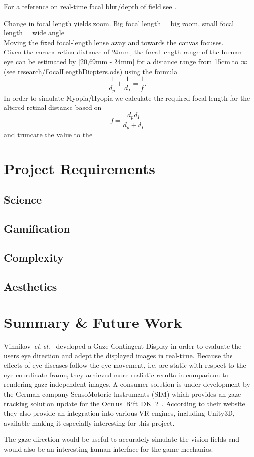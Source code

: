 \documentclass{acm_proc_article-sp}
\newcommand{\etal}{\textit{et. al.}}
\begin{document}
For a reference on real-time focal blur/depth of field see \cite{gpugems-DoF, gpugems3-DoF}.

Change in focal length yields zoom. Big focal length = big zoom, small focal length = wide angle\\
Moving the fixed focal-length lense away and towards the canvas focuses. \\
Given the cornea-retina distance of 24mm, the focal-length range of the human eye can be estimated by [20,69mm - 24mm] for a distance range from 15cm to ∞ (see research/FocalLengthDiopters.ods) using the formula
\begin{equation}
    \frac{1}{d_p} + \frac{1}{d_I} = \frac{1}{f}.
\end{equation}
In order to simulate Myopia/Hyopia we calculate the required focal length for the altered retinal distance based on
\begin{equation}
    f = \frac{d_p d_I}{d_p + d_I}
\end{equation}
and truncate the value to the 

\section{Project Requirements}
\subsection{Science}
\subsection{Gamification}
\subsection{Complexity}
\subsection{Aesthetics}
%
%
\section{Summary \& Future Work}
Vinnikov \etal \cite{gazedisplays} developed a Gaze-Contingent-Display in order to evaluate the users eye direction and adept the displayed images in real-time.
Because the effects of eye diseases follow the eye movement, i.e. are static with respect to the eye coordinate frame, they achieved more realistic results in comparison to rendering gaze-independent images.
A consumer solution is under development by the German company SensoMotoric Instruments (SIM) which provides an gaze tracking solution update for the Oculus Rift DK 2 \cite{smi-oculus, arstechoculus}.
According to their website they also provide an integration into various VR engines, including Unity3D, available making it especially interesting for this project.

The gaze-direction would be useful to accurately simulate the vision fields and would also be an interesting human interface for the game mechanics.
%
\printbibliography

\balancecolumns
\end{document}
